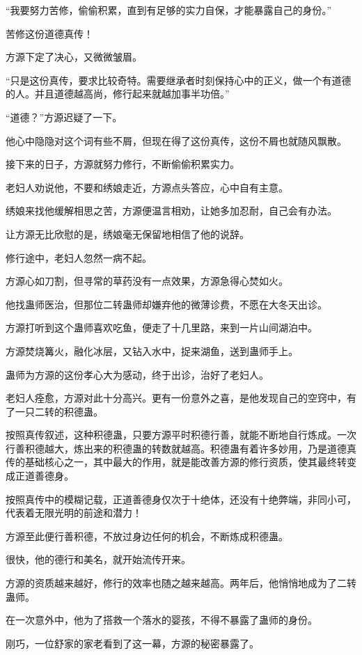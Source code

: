\begin{this_body}
“我要努力苦修，偷偷积累，直到有足够的实力自保，才能暴露自己的身份。”

苦修这份道德真传！

方源下定了决心，又微微皱眉。

“只是这份真传，要求比较奇特。需要继承者时刻保持心中的正义，做一个有道德的人。并且道德越高尚，修行起来就越加事半功倍。”

“道德？”方源迟疑了一下。

他心中隐隐对这个词有些不屑，但现在得了这份真传，这份不屑也就随风飘散。

接下来的日子，方源就努力修行，不断偷偷积累实力。

老妇人劝说他，不要和绣娘走近，方源点头答应，心中自有主意。

绣娘来找他缓解相思之苦，方源便温言相劝，让她多加忍耐，自己会有办法。

让方源无比欣慰的是，绣娘毫无保留地相信了他的说辞。

修行途中，老妇人忽然一病不起。

方源心如刀割，但寻常的草药没有一点效果，方源急得心焚如火。

他找蛊师医治，但那位二转蛊师却嫌弃他的微薄诊费，不愿在大冬天出诊。

方源打听到这个蛊师喜欢吃鱼，便走了十几里路，来到一片山间湖泊中。

方源焚烧篝火，融化冰层，又钻入水中，捉来湖鱼，送到蛊师手上。

蛊师为方源的这份孝心大为感动，终于出诊，治好了老妇人。

老妇人痊愈，方源对此十分高兴。更有一份意外之喜，是他发现自己的空窍中，有了一只二转的积德蛊。

按照真传叙述，这种积德蛊，只要方源平时积德行善，就能不断地自行炼成。一次行善积德越大，炼出来的积德蛊的转数就越高。积德蛊有着许多妙用，乃是道德真传的基础核心之一，其中最大的作用，就是能改善方源的修行资质，使其最终转变成正道善德身。

按照真传中的模糊记载，正道善德身仅次于十绝体，还没有十绝弊端，非同小可，代表着无限光明的前途和潜力！

方源至此便行善积德，不放过身边任何的机会，不断炼成积德蛊。

很快，他的德行和美名，就开始流传开来。

方源的资质越来越好，修行的效率也随之越来越高。两年后，他悄悄地成为了二转蛊师。

在一次意外中，他为了搭救一个落水的婴孩，不得不暴露了蛊师的身份。

刚巧，一位舒家的家老看到了这一幕，方源的秘密暴露了。


\end{this_body}
